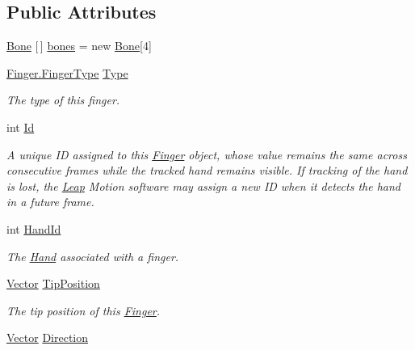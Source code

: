 \subsection*{Public Attributes}
\begin{DoxyCompactItemize}
\item 
\mbox{\hyperlink{class_leap_1_1_bone}{Bone}} \mbox{[}$\,$\mbox{]} \mbox{\hyperlink{class_leap_1_1_finger_a86f26bdb56cc3550a9f86120263e0319}{bones}} = new \mbox{\hyperlink{class_leap_1_1_bone}{Bone}}\mbox{[}4\mbox{]}
\item 
\mbox{\hyperlink{class_leap_1_1_finger_ae75e8d46a01aff0bd5c6d6fb99e2f2ba}{Finger.\+Finger\+Type}} \mbox{\hyperlink{class_leap_1_1_finger_a86fc4ed5138e26ac07ec0885f3627126}{Type}}
\begin{DoxyCompactList}\small\item\em The type of this finger. \end{DoxyCompactList}\item 
int \mbox{\hyperlink{class_leap_1_1_finger_a84df992a5e1b895acdc3b4c3da000950}{Id}}
\begin{DoxyCompactList}\small\item\em A unique ID assigned to this \mbox{\hyperlink{class_leap_1_1_finger}{Finger}} object, whose value remains the same across consecutive frames while the tracked hand remains visible. If tracking of the hand is lost, the \mbox{\hyperlink{namespace_leap}{Leap}} Motion software may assign a new ID when it detects the hand in a future frame. \end{DoxyCompactList}\item 
int \mbox{\hyperlink{class_leap_1_1_finger_ad9dbae16ebf61f9615d6a420bfc9d22e}{Hand\+Id}}
\begin{DoxyCompactList}\small\item\em The \mbox{\hyperlink{class_leap_1_1_hand}{Hand}} associated with a finger. \end{DoxyCompactList}\item 
\mbox{\hyperlink{struct_leap_1_1_vector}{Vector}} \mbox{\hyperlink{class_leap_1_1_finger_aae573cee6c1bdefd293838f133235b2d}{Tip\+Position}}
\begin{DoxyCompactList}\small\item\em The tip position of this \mbox{\hyperlink{class_leap_1_1_finger}{Finger}}. \end{DoxyCompactList}\item 
\mbox{\hyperlink{struct_leap_1_1_vector}{Vector}} \mbox{\hyperlink{class_leap_1_1_finger_ad9d71051a8cc2cd262226da61a43afd1}{Direction}}

\end{DoxyCompactItemize}
